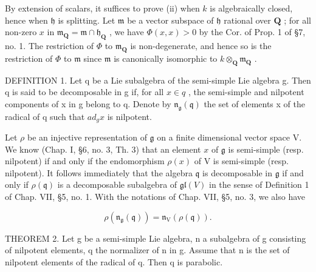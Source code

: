 By extension of scalars, it suffices to prove (ii) when \(k\) is algebraically closed, hence when \(\mathfrak{h}\) is splitting. Let \(\mathfrak{m}\) be a vector subspace of \(\mathfrak{h}\) rational over \(\mathbf{Q}\) ; for all non-zero \(x\) in \(\mathfrak{m}_{\mathbf{Q}} = \mathfrak{m} \cap \mathfrak{h}_{\mathbf{Q}}\) , we have \(\varPhi(x, x) > 0\) by the Cor. of Prop. 1 of §7, no. 1. The restriction of \(\varPhi\) to \(\mathfrak{m}_{\mathbf{Q}}\) is non-degenerate, and hence so is the restriction of \(\varPhi\) to \(\mathfrak{m}\) since \(\mathfrak{m}\) is canonically isomorphic to \(k \otimes_{\mathbf{Q}} \mathfrak{m}_{\mathbf{Q}}\) .

DEFINITION 1. Let q be a Lie subalgebra of the semi-simple Lie algebra g. Then q is said to be decomposable in g if, for all \(x \in q\) , the semi-simple and nilpotent components of x in g belong to q. Denote by \(\mathfrak{n}_{\mathfrak{g}}(\mathfrak{q})\) the set of elements x of the radical of q such that \(ad_{g}x\) is nilpotent.

Let \(\rho\) be an injective representation of \(\mathfrak{g}\) on a finite dimensional vector space V. We know (Chap. I, §6, no. 3, Th. 3) that an element \(x\) of \(\mathfrak{g}\) is semi-simple (resp. nilpotent) if and only if the endomorphism \(\rho(x)\) of V is semi-simple (resp. nilpotent). It follows immediately that the algebra \(\mathfrak{q}\) is decomposable in \(\mathfrak{g}\) if and only if \(\rho(\mathfrak{q})\) is a decomposable subalgebra of \(\mathfrak{gl}(V)\) in the sense of Definition 1 of Chap. VII, §5, no. 1. With the notations of Chap. VII, §5, no. 3, we also have

\[
\rho (\mathfrak {n} _ {\mathfrak {g}} (\mathfrak {q})) = \mathfrak {n} _ {\mathrm{V}} (\rho (\mathfrak {q})).
\]

THEOREM 2. Let g be a semi-simple Lie algebra, n a subalgebra of g consisting of nilpotent elements, q the normalizer of n in g. Assume that n is the set of nilpotent elements of the radical of q. Then q is parabolic.

